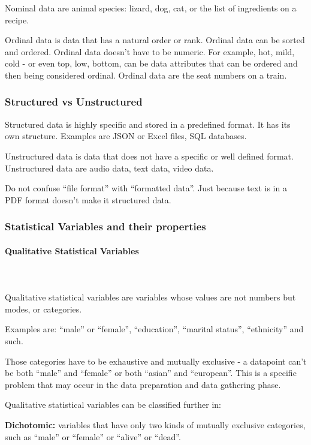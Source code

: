 \documentclass{article}
\begin{document}
Nominal data are animal species: lizard, dog, cat, or the list of ingredients on a recipe.

Ordinal data is data that has a natural order or rank. 
Ordinal data can be sorted and ordered. 
Ordinal data doesn’t have to be numeric. For example, hot, mild, cold - or even top, low, bottom, can be data attributes that can be ordered and then being considered ordinal. 
Ordinal data are the seat numbers on a train. 

\subsubsection{Structured vs Unstructured}
Structured data is highly specific and stored in a predefined format. It has its own structure.
Examples are JSON or Excel files, SQL databases. 

Unstructured data is data that does not have a specific or well defined format. 
Unstructured data are audio data, text data, video data. 

Do not confuse “file format” with “formatted data”. 
Just because text is in a PDF format doesn't make it structured data. 

\subsubsection{Statistical Variables and their properties}

\paragraph{Qualitative Statistical Variables}\mbox{} \\
\mbox{} \\

Qualitative statistical variables are variables whose values are not numbers but modes, or categories. 

Examples are: “male” or “female”, “education”, “marital status”, “ethnicity” and such.

Those categories have to be exhaustive and mutually exclusive - a datapoint can’t be both “male” and “female” or both “asian” and “european”. This is a specific problem that may occur in the data preparation and data gathering phase. 

Qualitative statistical variables can be classified further in:

\textbf{Dichotomic:} variables that have only two kinds of mutually exclusive categories,  such as “male” or “female” or “alive” or “dead”.
\end{document}

